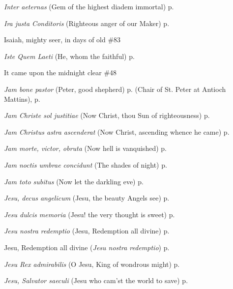 \begin{hangparas}{1.25em}{1}
\par\noindent
\textit{Inter aeternas} (Gem of the highest diadem immortal) \dotfill p. \pageref{BenedictMattins}
\par\noindent
\textit{Ira justa Conditoris} (Righteous anger of our Maker) \dotfill p. \pageref{PreciousBloodInvitatory}
\par\noindent
Isaiah, mighty seer, in days of old \dotfill \#83
\par\noindent
\textit{Iste Quem Laeti} (He, whom the faithful) \dotfill p. \pageref{JosephMattins}
\par\noindent
It came upon the midnight clear \dotfill \#48
\par\noindent
\textit{Jam bone pastor} (Peter, good shepherd) \dotfill p. \pageref{PeterAntiochMattins} (Chair of St. Peter at Antioch Mattins), p. \pageref{PeterMattins}
\par\noindent
\textit{Jam Christe sol justitiae} (Now Christ, thou Sun of righteousness) \dotfill p. \pageref{FirstLentMattins}
\par\noindent
\textit{Jam Christus astra ascenderat} (Now Christ, ascending whence he came) \dotfill p. \pageref{WhitsundayInvitatory}
\par\noindent
\textit{Jam morte, victor, obruta} (Now hell is vanquished) \dotfill p. \pageref{HolyRosaryMattins}
\par\noindent
\textit{Jam noctis umbrae concidunt} (The shades of night) \dotfill p. \pageref{ScholasticaMattins}
\par\noindent
\textit{Jam toto subitus} (Now let the darkling eve) \dotfill p. \pageref{SevenSorrowsEvensong}
\par\noindent
\textit{Jesu, decus angelicum} (Jesu, the beauty Angels see) \dotfill p. \pageref{HolyNameMattins}
\par\noindent
\textit{Jesu dulcis memoria} (Jesu! the very thought is sweet) \dotfill p. \pageref{HolyNameEvensong}
\par\noindent
\textit{Jesu nostra redemptio} (Jesu, Redemption all divine) \dotfill p. \pageref{AscensionMattins}
\par\noindent
Jesu, Redemption all divine (\textit{Jesu nostra redemptio}) \dotfill p. \pageref{AscensionMattins}
\par\noindent
\textit{Jesu Rex admirabilis} (O Jesu, King of wondrous might) \dotfill p. \pageref{HolyNameInvitatory}
\par\noindent
\textit{Jesu, Salvator saeculi} (Jesu who cam'st the world to save) \dotfill p. \pageref{AllHallowsMattins}

\end{hangparas}
